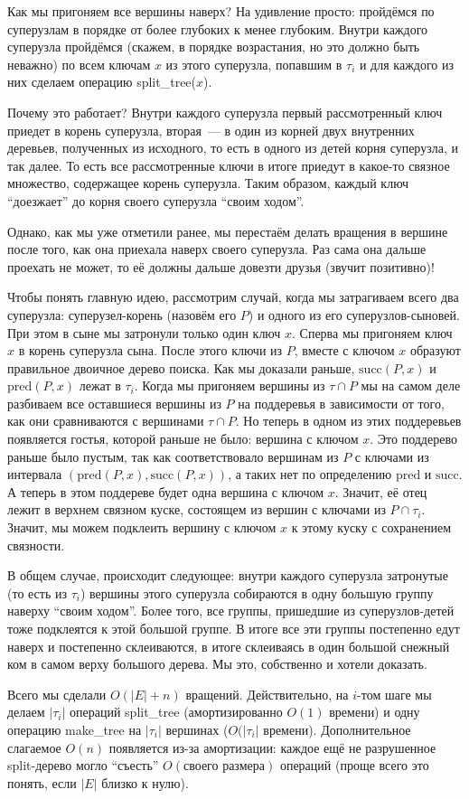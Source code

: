 Как мы пригоняем все вершины наверх? На удивление просто: пройдёмся по суперузлам в порядке от более глубоких к менее глубоким. Внутри каждого суперузла пройдёмся (скажем, в порядке возрастания, но это должно быть неважно) по всем ключам $x$ из этого суперузла, попавшим в $\tau_i$ и для каждого из них сделаем операцию 
\textrm{split\_tree}($x$). 

Почему это работает? Внутри каждого суперузла первый рассмотренный ключ приедет в корень суперузла, вторая~--- в один из корней двух внутренних деревьев, полученных из исходного, то есть в одного из детей корня суперузла, и так далее. То есть все рассмотренные ключи в итоге приедут в какое-то связное множество, содержащее корень суперузла. Таким образом, каждый ключ ``доезжает'' до корня своего суперузла ``своим ходом''.

Однако, как мы уже отметили ранее, мы перестаём делать вращения в вершине после того, как она приехала наверх своего суперузла. Раз сама она дальше проехать не может, то её должны
дальше довезти друзья (звучит позитивно)! 

Чтобы понять главную идею, рассмотрим случай, когда мы затрагиваем всего два суперузла: суперузел-корень (назовём его $P$) и одного из его суперузлов-сыновей. При этом в сыне мы затронули только один ключ $x$. Сперва мы пригоняем ключ $x$ в корень суперузла сына.
После этого ключи из $P$, вместе с ключом $x$ образуют правильное двоичное дерево поиска.
Как мы доказали раньше, $\mathrm{succ}(P, x)$ и $\mathrm{pred}(P, x)$ лежат в $\tau_i$. Когда мы пригоняем вершины из $\tau \cap P$ мы на самом деле разбиваем все оставшиеся вершины из $P$ на поддеревья в зависимости от того, как они сравниваются с вершинами $\tau \cap P$. Но теперь в одном из этих поддеревьев появляется гостья, которой раньше не было: вершина с ключом $x$. Это поддерево раньше было пустым, так как соответствовало вершинам из $P$ с ключами из интервала $(\mathrm{pred}(P, x), \mathrm{succ}(P, x))$, а таких нет по определению $\mathrm{pred}$ и $\mathrm{succ}$. А теперь в этом поддереве будет одна вершина с ключом $x$. Значит, её отец лежит в верхнем связном куске, состоящем из вершин с ключами из $P \cap \tau_i$. Значит, мы можем подклеить вершину с ключом $x$ к этому куску с сохранением связности. 

В общем случае, происходит следующее: внутри каждого суперузла затронутые (то есть из $\tau_i$) вершины этого суперузла собираются в одну большую группу наверху ``своим ходом''. Более того, все группы, пришедшие из суперузлов-детей тоже подклеятся к этой большой группе. В итоге все эти группы постепенно едут наверх и постепенно склеиваются, в итоге склеиваясь в один большой снежный ком в самом верху большого дерева. Мы это, собственно и хотели доказать. 

Всего мы сделали $O(|E| + n)$ вращений. Действительно, на $i$-том шаге мы делаем $|\tau_i|$ операций \textrm{split\_tree} (амортизированно $O(1)$ времени) и одну операцию \textrm{make\_tree} на $|\tau_i|$ вершинах ($O(|\tau_i|$ времени). Дополнительное слагаемое $O(n)$ появляется из-за амортизации: каждое ещё не разрушенное split-дерево могло ``съесть'' $O(\texttt{своего размера})$ операций (проще всего это понять, если $|E|$ близко к нулю).